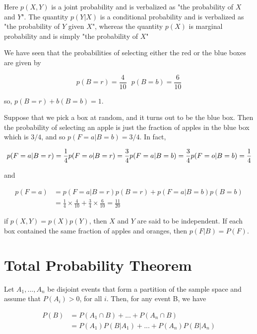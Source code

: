Here $p(X, Y)$ is a joint probability and is verbalized as "the probability of $X$ and $Y$". The quantity $p(Y | X)$ is a conditional probability and is verbalized as "the probability of $Y$ given $X$", whereas the quantity $p(X)$ is marginal probability and is simply "the probability of $X$"

We have seen that the probabilities of selecting either the red or the blue boxes are given by

\begin{equation}
    p(B = r) = \frac{4}{10}\ \ \ 
    p(B = b) = \frac{6}{10}
\end{equation}

so, $p(B = r) + b(B = b) = 1$. 

Suppose that we pick a box at random, and it turns out to be the blue box. Then the probability of selecting an apple is just the fraction of apples in the blue box which is $3/4$, and so $p(F = a | B = b) = 3/4$. In fact,

$$
    p(F = a | B = r) = \frac{1}{4}\\
    p(F = o | B = r) = \frac{3}{4}\\
    p(F = a | B = b) = \frac{3}{4}\\
    p(F = o | B = b) = \frac{1}{4}\\
$$

and

\begin{equation}
    \begin{split}
        p(F = a) & = p(F = a | B = r)p(B = r) + p(F = a | B = b)p(B = b)\\
        & = \frac{1}{4} \times \frac{4}{10} + \frac{3}{4} \times \frac{6}{10} = \frac{11}{20}
    \end{split}
\end{equation}

if $p(X, Y) = p(X)p(Y)$, then $X$ and $Y$ are said to be independent. If each box contained the same fraction of apples and oranges, then $p(F|B) = P(F)$.


\section{Total Probability Theorem}
Let $A_1, ..., A_n$ be disjoint events that form a partition of the sample space and assume that $P(A_i) > 0$, for all $i$. Then, for any event B, we have

\begin{equation}
    \begin{split}
        P(B) & = P(A_1 \cap B) + ... + P(A_n \cap B)\\
        & = P(A_1)P(B | A_1) + ... + P(A_n)P(B | A_n)
    \end{split}
\end{equation}


